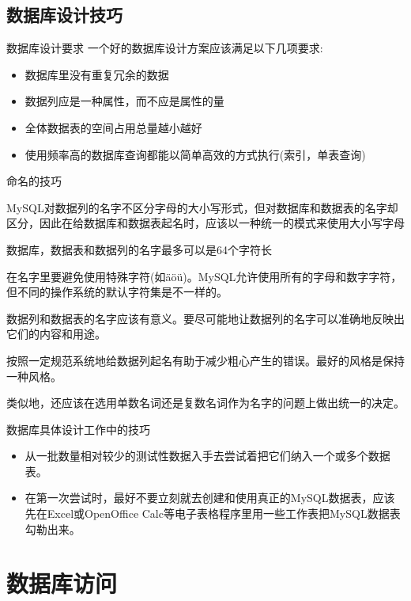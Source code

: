 \documentclass[CJK]{beamer}
\begin{document}
\begin{CJK*}{UTF8}{gbsn}
\subsection{数据库设计技巧}
\begin{frame}{数据库设计要求}
一个好的数据库设计方案应该满足以下几项要求:
\begin{itemize}
	\item 数据库里没有重复冗余的数据
	\item 数据列应是一种属性，而不应是属性的量
	\item 全体数据表的空间占用总量越小越好
	\item 使用频率高的数据库查询都能以简单高效的方式执行(索引，单表查询)
\end{itemize}
\end{frame}

\begin{frame}{命名的技巧}
\begin{itemize}
{\small
	\item MySQL对数据列的名字不区分字母的大小写形式，但对数据库和数据表的名字却区分，因此在给数据库和数据表起名时，应该以一种统一的模式来使用大小写字母
	\item 数据库，数据表和数据列的名字最多可以是64个字符长
	\item 在名字里要避免使用特殊字符(如\"{a}\"{o}\"{u})。MySQL允许使用所有的字母和数字字符，但不同的操作系统的默认字符集是不一样的。
	\item 数据列和数据表的名字应该有意义。要尽可能地让数据列的名字可以准确地反映出它们的内容和用途。
	\item 按照一定规范系统地给数据列起名有助于减少粗心产生的错误。最好的风格是保持一种风格。
	\item 类似地，还应该在选用单数名词还是复数名词作为名字的问题上做出统一的决定。
}
\end{itemize}
\end{frame}
\begin{frame}{数据库具体设计工作中的技巧}
\begin{itemize}
	\item 从一批数量相对较少的测试性数据入手去尝试着把它们纳入一个或多个数据表。
	\item 在第一次尝试时，最好不要立刻就去创建和使用真正的MySQL数据表，应该先在Excel或OpenOffice Calc等电子表格程序里用一些工作表把MySQL数据表勾勒出来。
\end{itemize}
\end{frame}
\section{数据库访问}

\end{CJK*}
\end{document}
